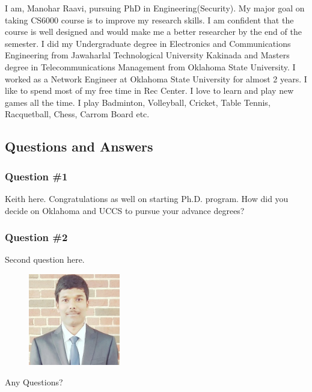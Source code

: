
I am, Manohar Raavi, pursuing PhD in Engineering(Security). My major goal on taking CS6000 course is to improve my research skills. 
I am confident that the course is well designed and would make me a better researcher by the end of the semester.
 I did my Undergraduate degree in Electronics and Communications Engineering from Jawaharlal Technological University Kakinada and Masters degree in Telecommunications Management from Oklahoma State University. I worked as a Network Engineer at Oklahoma State University for almost 2 years. I like to spend most of my free time in Rec Center.
 I love to learn and play new games all the time. I play Badminton, Volleyball, Cricket, Table Tennis, Racquetball, Chess, Carrom Board etc.

\subsection{Questions and Answers}
\subsubsection {Question \#1}
Keith here. Congratulations as well on starting Ph.D. program. How did you decide on Oklahoma and UCCS to pursue your advance degrees?

\subsubsection {Question \#2}

Second question here.

\begin{figure}[htp]
    \centering
    \includegraphics[width=4cm]{linkd1}
\end{figure}

Any Questions?